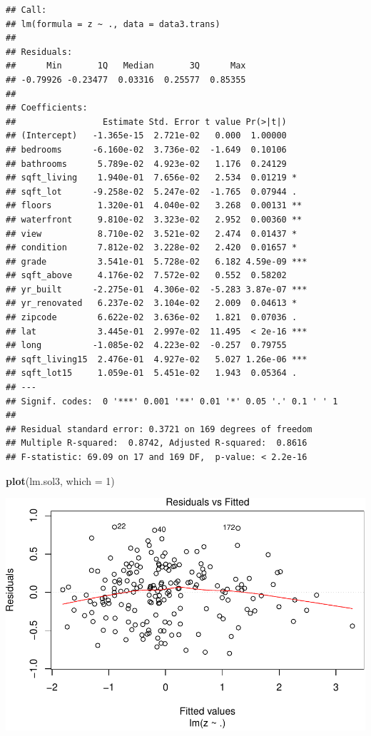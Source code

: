\documentclass[]{article}
\newenvironment{Shaded}{\begin{snugshade}}{\end{snugshade}}
\newcommand{\KeywordTok}[1]{\textcolor[rgb]{0.13,0.29,0.53}{\textbf{#1}}}
\newcommand{\DataTypeTok}[1]{\textcolor[rgb]{0.13,0.29,0.53}{#1}}
\newcommand{\DecValTok}[1]{\textcolor[rgb]{0.00,0.00,0.81}{#1}}
\newcommand{\NormalTok}[1]{#1}
\begin{document}
\begin{verbatim}
## Call:
## lm(formula = z ~ ., data = data3.trans)
## 
## Residuals:
##      Min       1Q   Median       3Q      Max 
## -0.79926 -0.23477  0.03316  0.25577  0.85355 
## 
## Coefficients:
##                 Estimate Std. Error t value Pr(>|t|)    
## (Intercept)   -1.365e-15  2.721e-02   0.000  1.00000    
## bedrooms      -6.160e-02  3.736e-02  -1.649  0.10106    
## bathrooms      5.789e-02  4.923e-02   1.176  0.24129    
## sqft_living    1.940e-01  7.656e-02   2.534  0.01219 *  
## sqft_lot      -9.258e-02  5.247e-02  -1.765  0.07944 .  
## floors         1.320e-01  4.040e-02   3.268  0.00131 ** 
## waterfront     9.810e-02  3.323e-02   2.952  0.00360 ** 
## view           8.710e-02  3.521e-02   2.474  0.01437 *  
## condition      7.812e-02  3.228e-02   2.420  0.01657 *  
## grade          3.541e-01  5.728e-02   6.182 4.59e-09 ***
## sqft_above     4.176e-02  7.572e-02   0.552  0.58202    
## yr_built      -2.275e-01  4.306e-02  -5.283 3.87e-07 ***
## yr_renovated   6.237e-02  3.104e-02   2.009  0.04613 *  
## zipcode        6.622e-02  3.636e-02   1.821  0.07036 .  
## lat            3.445e-01  2.997e-02  11.495  < 2e-16 ***
## long          -1.085e-02  4.223e-02  -0.257  0.79755    
## sqft_living15  2.476e-01  4.927e-02   5.027 1.26e-06 ***
## sqft_lot15     1.059e-01  5.451e-02   1.943  0.05364 .  
## ---
## Signif. codes:  0 '***' 0.001 '**' 0.01 '*' 0.05 '.' 0.1 ' ' 1
## 
## Residual standard error: 0.3721 on 169 degrees of freedom
## Multiple R-squared:  0.8742, Adjusted R-squared:  0.8616 
## F-statistic: 69.09 on 17 and 169 DF,  p-value: < 2.2e-16
\end{verbatim}

\begin{Shaded}
\begin{Highlighting}[]
\KeywordTok{plot}\NormalTok{(lm.sol3, }\DataTypeTok{which =} \DecValTok{1}\NormalTok{)}
\end{Highlighting}
\end{Shaded}

\includegraphics{FinalProjectForRegressionAnalysis_files/figure-latex/unnamed-chunk-21-1.pdf}
\end{document}
